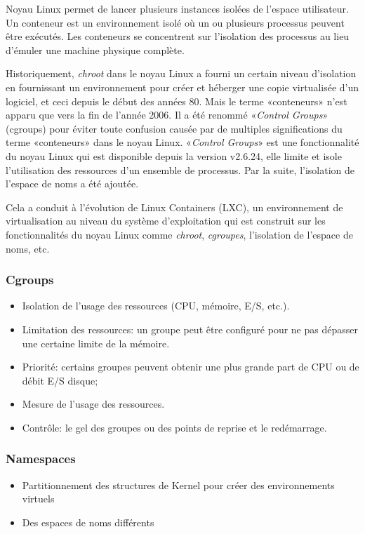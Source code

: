 \begin{onehalfspace}
Noyau Linux permet de lancer plusieurs instances isolées de l'espace utilisateur. Un conteneur est un environnement isolé où un ou plusieurs processus peuvent être exécutés. Les conteneurs se concentrent sur l'isolation des processus au lieu d'émuler une machine physique complète.

Historiquement, \emph{chroot} dans le noyau Linux a fourni un certain niveau d'isolation en fournissant un environnement pour créer et héberger une copie virtualisée d'un logiciel, et ceci depuis le début des années 80. Mais le terme «conteneurs» n'est apparu que vers la fin de l'année 2006. Il a été renommé «\emph{Control Groups}» (cgroups) pour éviter toute confusion causée par de multiples significations du terme «conteneurs» dans le noyau Linux. «\emph{Control Groups}» est une fonctionnalité du noyau Linux qui est disponible depuis la version v2.6.24, elle limite et isole l'utilisation des ressources d'un ensemble de processus. Par la suite, l'isolation de l'espace de noms a été ajoutée.


Cela a conduit à l'évolution de Linux Containers (LXC), un environnement de virtualisation au niveau du système d'exploitation qui est construit sur les fonctionnalités du noyau Linux comme \emph{chroot}, \emph{cgroupes}, l'isolation de l'espace de noms, etc.

\subsubsection*{Cgroups}

\begin{itemize}
\item Isolation de l'usage des ressources (CPU, mémoire, E/S, etc.).
\item Limitation des ressources: un groupe peut être configuré pour ne pas dépasser une certaine limite de la mémoire.
\item Priorité: certains groupes peuvent obtenir une plus grande part de CPU ou de débit E/S disque;
\item Mesure de l'usage des ressources.
\item Contrôle: le gel des groupes ou des points de reprise et le redémarrage.
\end{itemize}

\subsubsection*{Namespaces}
\begin{itemize}
\item Partitionnement des structures de Kernel pour créer des environnements virtuels
\item Des espaces de noms différents


\end{itemize}
\end{onehalfspace}
